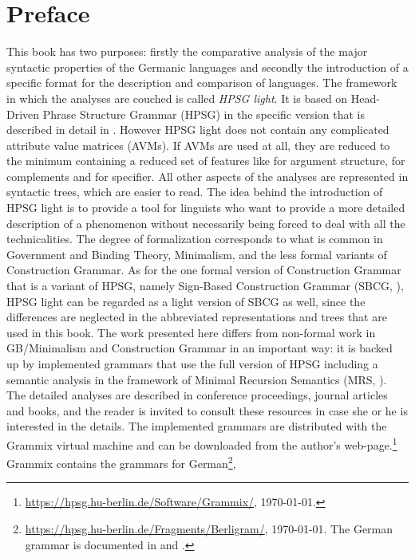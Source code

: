 \chapter{Preface}

This book has two purposes: firstly the comparative analysis of the major syntactic properties of the
Germanic languages and secondly the introduction of a specific format for the description and
comparison of languages. The framework in which the analyses are couched is called \emph{HPSG
  light}. It is based on Head-Driven Phrase Structure Grammar (HPSG) \citep{ps,ps2,HPSGHandbook} in the specific version that is described in detail in
. However HPSG light does not contain any complicated attribute value
matrices (AVMs). If AVMs are used at all, they are reduced to the minimum containing a reduced set
of features like \argst for argument structure, \comps for complements and \spr for specifier. All
other aspects of the analyses are represented in syntactic trees, which are easier to read. The idea
behind the introduction of HPSG light is to provide a tool for linguists who want to provide a
more detailed description of a phenomenon without necessarily being forced to deal with all the
technicalities. The degree of formalization corresponds to what is common in Government and Binding
Theory, Minimalism, and the less formal variants of Construction Grammar. As for the one formal version
of Construction Grammar that is a variant of HPSG, namely Sign-Based Construction Grammar (SBCG, \citealp{Sag2012a}), HPSG
light can be regarded as a light version of SBCG as well, since the differences are neglected in the
abbreviated representations and trees that are used in this book. The work presented here differs
from non-formal work in GB/Minimalism and Construction Grammar in an important way: it is backed up
by implemented grammars that use the full version of HPSG including a semantic analysis in the
framework of Minimal Recursion Semantics (MRS, ). The detailed analyses are described in
conference proceedings, journal articles and books, and the reader is invited to consult these
resources in case she or he is interested in the details. The implemented grammars are distributed
with the Grammix virtual machine \citep{MuellerGrammix} and can be downloaded from the author's
web-page.\footnote{
\url{https://hpsg.hu-berlin.de/Software/Grammix/}, \today.} Grammix contains the grammars for
German\footnote{
\url{https://hpsg.hu-berlin.de/Fragments/Berligram/}, \today. The German grammar is documented in
 and .
},
